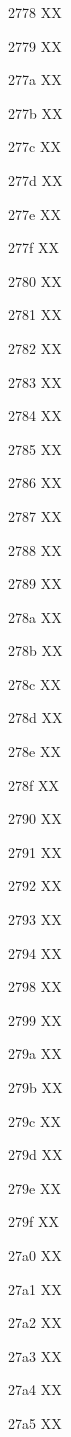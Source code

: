 \documentclass[11pt]{article}
\begin{document}
2778 X{}X

2779 X{}X

277a X{}X

277b X{}X

277c X{}X

277d X{}X

277e X{}X

277f X{}X

2780 X{}X

2781 X{}X

2782 X{}X

2783 X{}X

2784 X{}X

2785 X{}X

2786 X{}X

2787 X{}X

2788 X{}X

2789 X{}X

278a X{}X

278b X{}X

278c X{}X

278d X{}X

278e X{}X

278f X{}X

2790 X{}X

2791 X{}X

2792 X{}X

2793 X{}X

2794 X{}X

2798 X{}X

2799 X{}X

279a X{}X

279b X{}X

279c X{}X

279d X{}X

279e X{}X

279f X{}X

27a0 X{}X

27a1 X{}X

27a2 X{}X

27a3 X{}X

27a4 X{}X

27a5 X{}X
\end{document}
